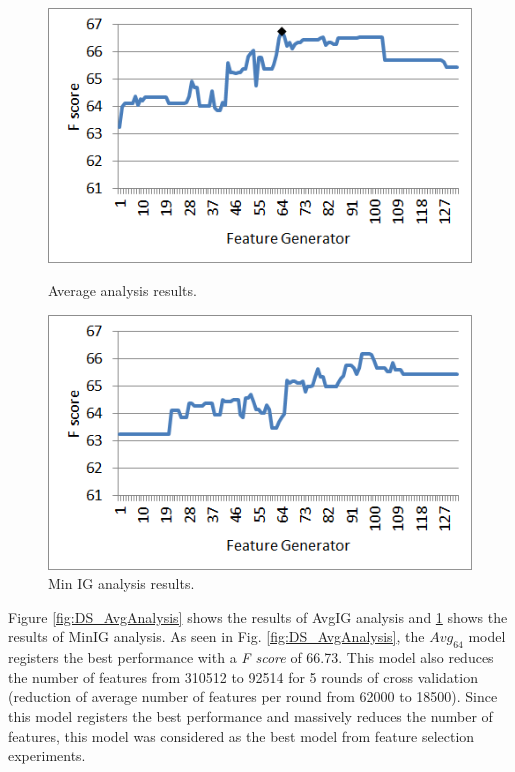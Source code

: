 \begin{figure}
\centering
\begin{minipage}{.5\textwidth}
  \centering
  \includegraphics[width=.95\textwidth]{figures/DSAvgAnalysis.png}
  \caption{Average analysis results.}
  \label{fig:DS_AvgAnalysis}
\end{minipage}%
\begin{minipage}{.5\textwidth}
  \centering
  \includegraphics[width=.95\textwidth]{figures/DSMinAnalysis.png}
  \caption{Min IG analysis results.}
  \label{fig:DS_MinAnalysis}
\end{minipage}
\end{figure}

Figure \ref{fig:DS_AvgAnalysis} shows the results of AvgIG analysis and \ref{fig:DS_MinAnalysis} shows the results of MinIG analysis. As seen in Fig. \ref{fig:DS_AvgAnalysis}, the $Avg_{64}$ model registers the best performance with a \textit{F score} of 66.73. This model also reduces the number of features from 310512 to 92514 for 5 rounds of cross validation (reduction of average number of features per round from 62000 to 18500). Since this model registers the best performance and massively reduces the number of features, this model was considered as the best model from feature selection experiments.

